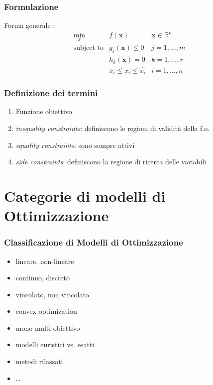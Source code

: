 \documentclass{beamer}
\begin{document}
\begin{frame}
\frametitle{Formulazione}
 Forma generale \cite{vanderplaats1984numerical}:
	\begin{eqnarray}
	\underset{x}{\text{min}} & f(\mathbf{x}) & \mathbf{x} \in \mathbb{R}^n \\
	\text{subject to} & g_j(\mathbf{x}) \leq 0 & j=1,\ldots, m \\
	& h_k(\mathbf{x}) = 0 & k=1,\ldots, r \\
	&  \check{x_i} \leq x_i \leq \hat{x_i}  & i=1,\ldots, n
	\end{eqnarray}
\end{frame}


\begin{frame}
	\frametitle{Definizione dei termini}
	\begin{enumerate}
		\item Funzione obiettivo
		\item \textit{inequality constraints}: definiscono le regioni di validit\`{a} della f.o.
		\item \textit{equality constraints}: sono sempre attivi
		\item \textit{side constraints}: definiscono la regione di ricerca delle variabili
	\end{enumerate}
\end{frame}



\section{Categorie di modelli di Ottimizzazione}


\begin{frame}
	\frametitle{Classificazione di Modelli di Ottimizzazione}
	\begin{itemize}
		\item lineare, non-lineare \cite{vanderbei2014linear}
		\item continuo, discreto
		\item vincolato, non vincolato 
		\item convex optimization \cite{boyd2004convex}
		\item mono-multi obiettivo \cite{desideri2010}
		\item modelli euristici vs. esatti
		\item metodi rilassati
		\item \ldots
	\end{itemize}
\end{frame}
\end{document}
